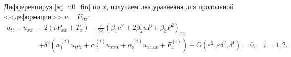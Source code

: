 \documentclass[12pt, a4paper]{report}
\begin{document}
Дифференцируя \eqref{eq_u0_fin} по $x$, получаем два уравнения для продольной <<деформации>> $u = U_{0x}$:
\begin{equation}\label{eq_u0_def_fin}
\begin{split}
u_{tt} - u_{xx} &- 2\left(\nu P_{xx} + T_x\right) - \frac{\varepsilon}{2 E} \left(\beta_1 u^2 + 2 \beta_2 u P + \beta_3 P^2\right)_{xx}\\
& + \delta^2 \left(\alpha_1^{(i)} u_{tttt} + \alpha_2^{(i)} u_{xxtt} + \alpha_3^{(i)} u_{xxxx} + F^{(i)}_x \right) + O(\varepsilon^2, \varepsilon\delta^2, \delta^4) = 0, \quad i = 1,2.
\end{split}
\end{equation}
\end{document}
